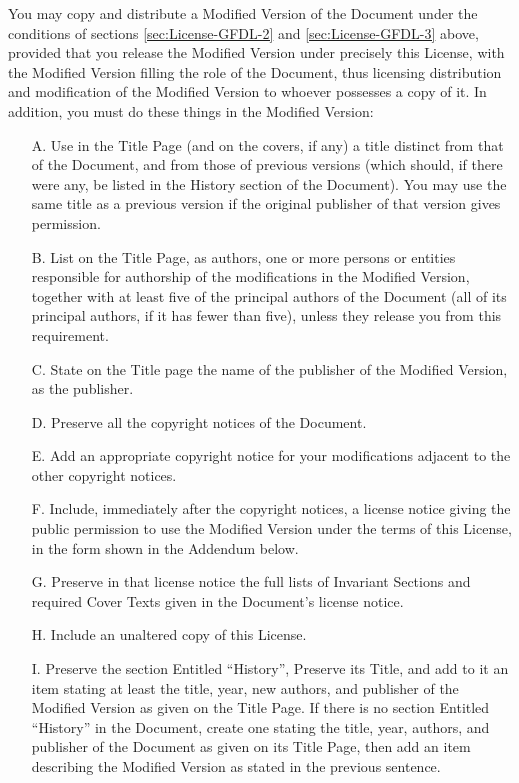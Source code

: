 You may copy and distribute a Modified Version of the Document under
the conditions of sections \ref{sec:License-GFDL-2} and
\ref{sec:License-GFDL-3} above, provided that you release the Modified
Version under precisely this License, with the Modified Version
filling the role of the Document, thus licensing distribution and
modification of the Modified Version to whoever possesses a copy of
it.  In addition, you must do these things in the Modified Version:

\begin{itemize}

\item [A.] Use in the Title Page (and on the covers, if any) a title
distinct from that of the Document, and from those of previous
versions (which should, if there were any, be listed in the History
section of the Document).  You may use the same title as a previous
version if the original publisher of that version gives permission.

\item [B.] List on the Title Page, as authors, one or more persons or
entities responsible for authorship of the modifications in the
Modified Version, together with at least five of the principal authors
of the Document (all of its principal authors, if it has fewer than
five), unless they release you from this requirement.

\item [C.] State on the Title page the name of the publisher of the
Modified Version, as the publisher.

\item [D.] Preserve all the copyright notices of the Document.

\item [E.] Add an appropriate copyright notice for your modifications
adjacent to the other copyright notices.

\item [F.] Include, immediately after the copyright notices, a license
notice giving the public permission to use the Modified Version under
the terms of this License, in the form shown in the Addendum below.

\item [G.] Preserve in that license notice the full lists of Invariant
Sections and required Cover Texts given in the Document's license
notice.

\item [H.] Include an unaltered copy of this License.

\item [I.] Preserve the section Entitled ``History'', Preserve its
Title, and add to it an item stating at least the title, year, new
authors, and publisher of the Modified Version as given on the Title
Page.  If there is no section Entitled ``History'' in the Document,
create one stating the title, year, authors, and publisher of the
Document as given on its Title Page, then add an item describing the
Modified Version as stated in the previous sentence.


\end{itemize}
